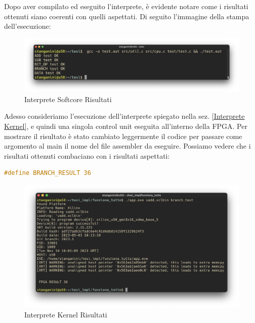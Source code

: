 \clearpage

Dopo aver compilato ed eseguito l'interprete, è evidente notare come i risultati ottenuti siano coerenti con quelli aspettati. Di seguito l'immagine della stampa dell'esecuzione:

\begin{figure}[h!]
\centering
\includegraphics[scale=0.35]{images/Capitolo5/1_im.png}
\caption{Interprete Softcore Risultati}
\label{1curisultati}
\end{figure}

\vspace{0.3cm}

Adesso consideriamo l'esecuzione dell'interprete spiegato nella sez. \ref{Interprete Kernel}, e quindi una singola control unit eseguita all'interno della FPGA.
Per mostrare il risultato è stato cambiato leggermente il codice per passare come argomento al main il nome del file assembler da eseguire.
Possiamo vedere che i risultati ottenuti combaciano con i risultati aspettati:

\begin{lstlisting}[language=C,caption={Risultato Branch}]
#define BRANCH_RESULT 36
\end{lstlisting}

\begin{figure}[h!]
\centering
\includegraphics[scale=0.35]{images/Capitolo5/2_im.png}
\caption{Interprete Kernel Risultati}
\label{typeB}
\end{figure}

